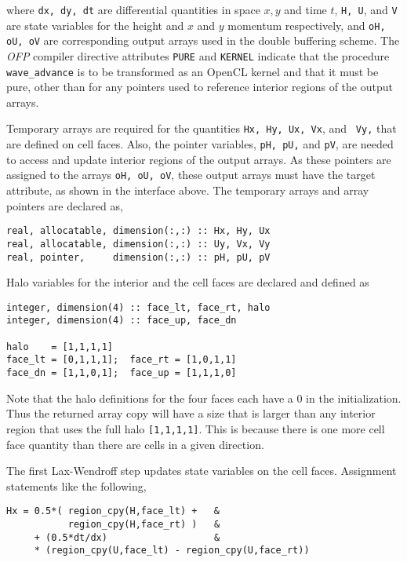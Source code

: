 \noindent
where {\tt dx, dy, dt} are differential quantities in space $x, y$ and time $t$,
{\tt H, U}, and {\tt V} are state variables for the height and $x$ and $y$
momentum respectively, and {\tt oH, oU, oV} are corresponding output arrays used
in the double buffering scheme.  The \emph{OFP} compiler directive attributes
{\tt PURE} and {\tt KERNEL} indicate that the procedure {\tt wave\_advance} is
to be transformed as an OpenCL kernel and that it must be pure, other than for any
pointers used to reference interior regions of the output arrays.

Temporary arrays are required for the quantities {\tt Hx, Hy, Ux, Vx}, and {\tt
  Vy,} that are defined on cell faces.  Also, the pointer variables, {\tt pH,
  pU,} and {\tt pV}, are needed to access and update interior regions of the
output arrays.  As these pointers are assigned to the arrays {\tt oH, oU, oV},
these output arrays must have the target attribute, as shown in the interface
above.  The temporary arrays and array pointers are declared as,

{\small
\begin{verbatim}
real, allocatable, dimension(:,:) :: Hx, Hy, Ux
real, allocatable, dimension(:,:) :: Uy, Vx, Vy
real, pointer,     dimension(:,:) :: pH, pU, pV
\end{verbatim}
}

Halo variables for the interior and the cell faces are declared and defined as

{\small
\begin{verbatim}
integer, dimension(4) :: face_lt, face_rt, halo
integer, dimension(4) :: face_up, face_dn

halo    = [1,1,1,1]
face_lt = [0,1,1,1];  face_rt = [1,0,1,1]
face_dn = [1,1,0,1];  face_up = [1,1,1,0]
\end{verbatim}
}

\noindent
Note that the halo definitions for the four faces each have a 0 in the
initialization. Thus the returned array copy will have a size that is larger
than any interior region that uses the full halo {\tt [1,1,1,1]}.  This is
because there is one more cell face quantity than there are cells in a given
direction.

The first Lax-Wendroff step updates state variables on the cell faces.  Assignment
statements like the following,

{\small
\begin{verbatim}
Hx = 0.5*( region_cpy(H,face_lt) +   &
           region_cpy(H,face_rt) )   &
     + (0.5*dt/dx)                   &
     * (region_cpy(U,face_lt) - region_cpy(U,face_rt))
\end{verbatim}
}

